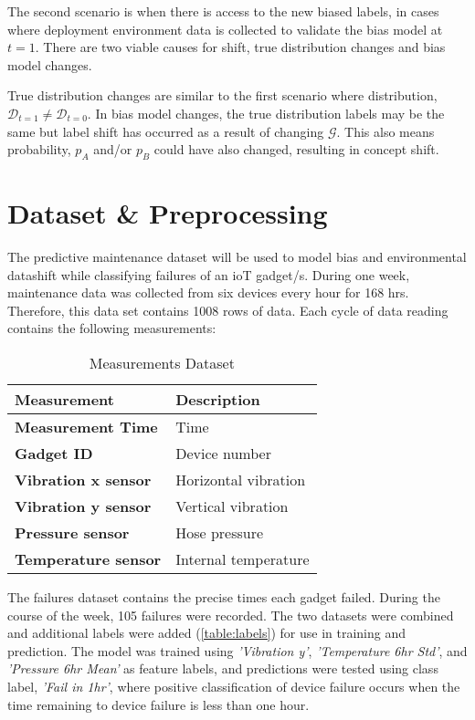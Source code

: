 The second scenario is when there is access to the new biased labels, 
in cases where deployment environment data is collected to validate the bias model at $t = 1$.
There are two viable causes for shift, true distribution changes and bias model changes.

True distribution changes are similar to the first scenario where distribution, $\mathcal{D}_{t=1} \neq \mathcal{D}_{t=0}$.
In bias model changes, the true distribution labels may be the same but label shift has occurred as a result of changing $\mathcal{G}$.
This also means probability, $p_A$ and/or $p_B$ could have also changed, resulting in concept shift.


\section{Dataset \& Preprocessing}
The predictive maintenance dataset \cite{ahonen} will be used to model bias and environmental datashift while classifying failures of an ioT gadget/s.
During one week, maintenance data was collected from six devices every hour for 168 hrs.
Therefore, this data set contains 1008 rows of data. 
Each cycle of data reading contains the following measurements: 

\begin{table}[H]
    \begin{center}
        \caption{Measurements Dataset} 
        \begin{tabular}{ ll } 
         \toprule
         \textbf{Measurement} & \textbf{Description} \\  [0.5ex] 
         \midrule
         \textbf{Measurement Time} & Time \\
         \textbf{Gadget ID} & Device number \\
         \textbf{Vibration x sensor} & Horizontal vibration \\ 
         \textbf{Vibration y sensor} & Vertical vibration \\ 
         \textbf{Pressure sensor} & Hose pressure \\
         \textbf{Temperature sensor} & Internal temperature \\
         \bottomrule
        \end{tabular}
    \end{center}
\end{table}

The failures dataset contains the precise times each gadget failed. 
During the course of the week, 105 failures were recorded. 
The two datasets were combined and additional labels were added (\ref{table:labels}) for use in training and prediction.
The model was trained using \textit{'Vibration y'}, \textit{'Temperature 6hr Std'}, 
and \textit{'Pressure 6hr Mean'} as feature labels, and predictions were tested using class label, \textit{'Fail in 1hr'},
where positive classification of device failure occurs when the time remaining to device failure is less than one hour.

